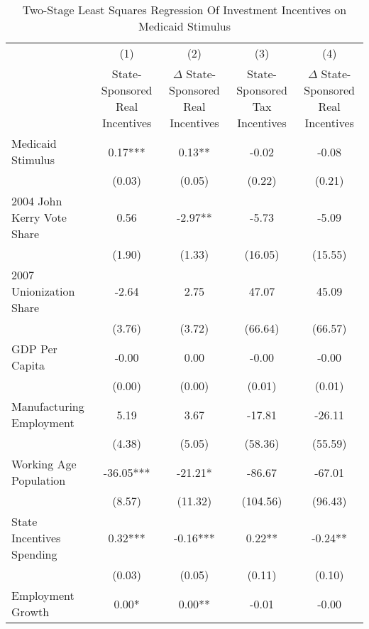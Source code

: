 \begin{table}[htbp]\centering
\def\sym#1{\ifmmode^{#1}\else\(^{#1}\)\fi}
\caption{Two-Stage Least Squares Regression Of Investment Incentives on Medicaid Stimulus}
\begin{tabular}{l*{4}{c}}
\hline\hline
                    &\multicolumn{1}{c}{(1)}   &\multicolumn{1}{c}{(2)}   &\multicolumn{1}{c}{(3)}   &\multicolumn{1}{c}{(4)}   \\
                    &State-Sponsored Real Incentives}   &$\Delta$ State-Sponsored Real Incentives   &State-Sponsored Tax Incentives   &$\Delta$ State-Sponsored Real Incentives   \\
\hline
Medicaid Stimulus   &        0.17***&        0.13** &       -0.02   &       -0.08   \\
                    &      (0.03)   &      (0.05)   &      (0.22)   &      (0.21)   \\
2004 John Kerry Vote Share&        0.56   &       -2.97** &       -5.73   &       -5.09   \\
                    &      (1.90)   &      (1.33)   &     (16.05)   &     (15.55)   \\
2007 Unionization Share&       -2.64   &        2.75   &       47.07   &       45.09   \\
                    &      (3.76)   &      (3.72)   &     (66.64)   &     (66.57)   \\
GDP Per Capita      &       -0.00   &        0.00   &       -0.00   &       -0.00   \\
                    &      (0.00)   &      (0.00)   &      (0.01)   &      (0.01)   \\
Manufacturing Employment&        5.19   &        3.67   &      -17.81   &      -26.11   \\
                    &      (4.38)   &      (5.05)   &     (58.36)   &     (55.59)   \\
Working Age Population&      -36.05***&      -21.21*  &      -86.67   &      -67.01   \\
                    &      (8.57)   &     (11.32)   &    (104.56)   &     (96.43)   \\
State Incentives Spending&        0.32***&       -0.16***&        0.22** &       -0.24** \\
                    &      (0.03)   &      (0.05)   &      (0.11)   &      (0.10)   \\
Employment Growth   &        0.00*  &        0.00** &       -0.01   &       -0.00   \\

\end{tabular}
\end{table}
